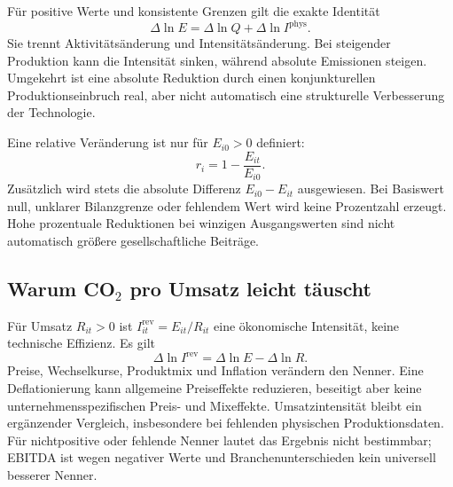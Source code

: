 \documentclass[11pt,a4paper]{article}
\newcommand{\NA}{\textnormal{nicht bestimmbar}}
\begin{document}
Für positive Werte und konsistente Grenzen gilt die exakte Identität
\begin{equation}
\Delta\ln E=\Delta\ln Q+\Delta\ln I^{\mathrm{phys}}.
\label{eq:decomposition}
\end{equation}
Sie trennt Aktivitätsänderung und Intensitätsänderung. Bei steigender Produktion kann die Intensität sinken, während absolute Emissionen steigen. Umgekehrt ist eine absolute Reduktion durch einen konjunkturellen Produktionseinbruch real, aber nicht automatisch eine strukturelle Verbesserung der Technologie.

Eine relative Veränderung ist nur für $E_{i0}>0$ definiert:
\begin{equation}
r_i=1-\frac{E_{it}}{E_{i0}}.
\end{equation}
Zusätzlich wird stets die absolute Differenz $E_{i0}-E_{it}$ ausgewiesen. Bei Basiswert null, unklarer Bilanzgrenze oder fehlendem Wert wird keine Prozentzahl erzeugt. Hohe prozentuale Reduktionen bei winzigen Ausgangswerten sind nicht automatisch größere gesellschaftliche Beiträge.

\subsection{Warum CO\texorpdfstring{$_2$}{2} pro Umsatz leicht täuscht}
Für Umsatz $R_{it}>0$ ist $I^{\mathrm{rev}}_{it}=E_{it}/R_{it}$ eine ökonomische Intensität, keine technische Effizienz. Es gilt
\begin{equation}
\Delta\ln I^{\mathrm{rev}}=\Delta\ln E-\Delta\ln R.
\end{equation}
Preise, Wechselkurse, Produktmix und Inflation verändern den Nenner. Eine Deflationierung kann allgemeine Preiseffekte reduzieren, beseitigt aber keine unternehmensspezifischen Preis- und Mixeffekte. Umsatzintensität bleibt ein ergänzender Vergleich, insbesondere bei fehlenden physischen Produktionsdaten. Für nichtpositive oder fehlende Nenner lautet das Ergebnis \NA; EBITDA ist wegen negativer Werte und Branchenunterschieden kein universell besserer Nenner.
\end{document}

